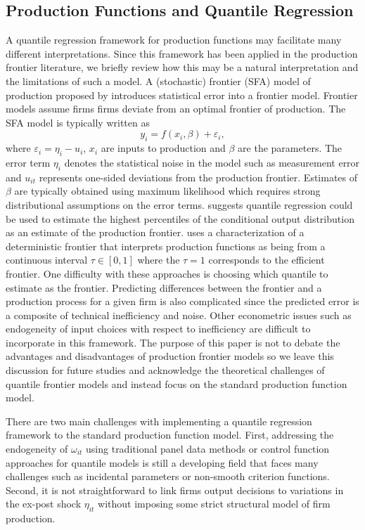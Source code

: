 \documentclass[11pt]{article}
\begin{document}
\subsection{Production Functions and Quantile Regression}


A quantile regression framework for production functions may facilitate many different interpretations. Since this framework has been applied in the production frontier literature, we briefly review how this may be a natural interpretation and the limitations of such a model. A (stochastic) frontier (SFA) model of production proposed by \cite{Aigner1977} introduces statistical error into a frontier model. Frontier models assume firms firms deviate from an optimal frontier of production. The SFA model is typically written as
\begin{equation}
y_{i}=f(x_{i}, \beta)+\varepsilon_{i},
\end{equation}
where $\varepsilon_{i}=\eta_{i}-u_{i}$, $x_{i}$ are inputs to production and $\beta$ are the parameters. The error term $\eta_{i}$ denotes the statistical noise in the model such as measurement error and $u_{it}$ represents one-sided deviations from the production frontier. Estimates of $\beta$ are typically obtained using maximum likelihood which requires strong distributional assumptions on the error terms. \cite{Bernini2004} suggests quantile regression could be used to estimate the highest percentiles of the conditional output distribution as an estimate of the production frontier. \cite{Aragon2005} uses a characterization of a deterministic frontier that interprets production functions as being from a continuous interval $\tau\in[0,1]$ where the $\tau=1$ corresponds to the efficient frontier. One difficulty with these approaches is choosing which quantile to estimate as the frontier. Predicting differences between the frontier and a production process for a given firm is also complicated since the predicted error is a composite of technical inefficiency and noise. Other econometric issues such as endogeneity of input choices with respect to inefficiency are difficult to incorporate in this framework. The purpose of this paper is not to debate the advantages and disadvantages of production frontier models so we leave this discussion for future studies and acknowledge the theoretical challenges of quantile frontier models and instead focus on the standard production function model.

There are two main challenges with implementing a quantile regression framework to the standard production function model. First, addressing the endogeneity of $\omega_{it}$ using traditional panel data methods or control function approaches for quantile models is still a developing field that faces many challenges such as incidental parameters or non-smooth criterion functions. Second, it is not straightforward to link firms output decisions to variations in the ex-post shock $\eta_{it}$ without imposing some strict structural model of firm production.
\end{document}
